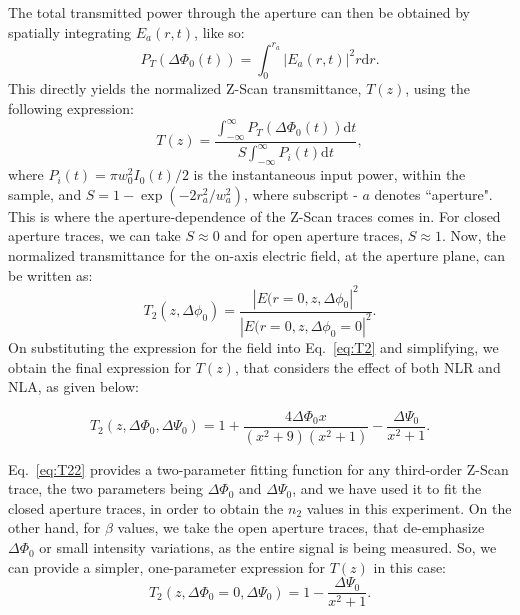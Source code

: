 \documentclass[%
 reprint,
amsmath,
amssymb,
10pt
]{revtex4-2}
\begin{document}
The total transmitted power through the aperture can then be obtained by spatially integrating $E_a(r, t)$, like so:
\begin{equation}
    P_T(\Delta\Phi_0(t)) = \int_0^{r_{a}}|E_a(r, t)|^2 r \mathrm{d}r .
    \label{eq:PT}
\end{equation}
This directly yields the normalized Z-Scan transmittance, $T(z)$, using the following expression:
\begin{equation}
    T(z) =  \frac{\int_{-\infty}^\infty P_T(\Delta\Phi_0(t))\mathrm{d}t}{S\int_{-\infty}^\infty P_i(t) \mathrm{d}t},
    \label{eq:Tz}
\end{equation}
where $P_i(t) = \pi w_0^2 I_0(t) / 2$ is the instantaneous input power, within the sample, and $S = 1 - \exp(-2r_a^2/w_a^2)$, where subscript - $a$ denotes ``aperture". This is where the aperture-dependence of the Z-Scan traces comes in. For closed aperture traces, we can take $S \approx 0$ and for open aperture traces, $S \approx 1$. Now, the normalized transmittance for the on-axis electric field, at the aperture plane, can be written as:
\begin{equation}
    \boxed{
        T_2(z, \Delta\phi_0) = \frac{|E(r=0,z,\Delta\phi_0|^2}{|E(r=0,z,\Delta\phi_0 = 0|^2}
    }.
    \label{eq:T2}
\end{equation}
On substituting the expression for the field into Eq.~\ref{eq:T2} and simplifying, we obtain the final expression for $T(z)$, that considers the effect of both NLR and NLA, as given below:
\begin{widetext}
\begin{equation}
    \boxed{
        T_2(z, \Delta\Phi_0, \Delta\Psi_0) = 1 + \frac{4\Delta\Phi_0 x}{(x^2 + 9)(x^2 + 1)}  - \frac{\Delta\Psi_0}{x^2 + 1}
    }.
    \label{eq:T22}
\end{equation}
\end{widetext}
Eq.~\ref{eq:T22} provides a two-parameter fitting function for any third-order Z-Scan trace, the two parameters being $\Delta\Phi_0$ and $\Delta\Psi_0$, and we have used it to fit the closed aperture traces, in order to obtain the $n_2$ values in this experiment. On the other hand, for $\beta$ values, we take the open aperture traces, that de-emphasize $\Delta\Phi_0$ or small intensity variations, as the entire signal is being measured. So, we can provide a simpler, one-parameter expression for $T(z)$ in this case:
\begin{equation}
    \boxed{
        T_2(z, \Delta\Phi_0 = 0, \Delta\Psi_0) = 1  - \frac{\Delta\Psi_0}{x^2 + 1}
    }.
    \label{eq:T2o}
\end{equation}
\end{document}
